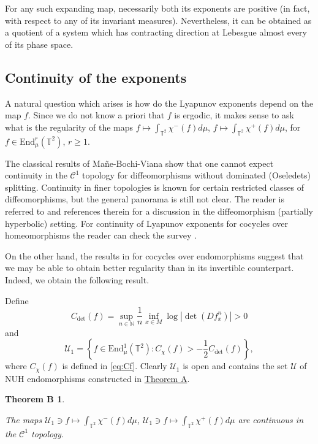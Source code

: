 \documentclass[11pt,letterpaper,reqno]{article}
\newtheorem*{theoremB}{Theorem B}
\newcommand{\Tor}{\mathbb{T}^2}
\newcommand{\TT}{\mathbb{T}^2}
\begin{document}
For any such expanding map, necessarily both its exponents are positive (in fact, with respect to any of its invariant measures). Nevertheless, it can be obtained as a quotient of a system which has contracting direction at Lebesgue almost every of its phase space. 



\subsection{Continuity of the exponents}

A natural question which arises is how do the Lyapunov exponents depend on the map $f$. Since we do not know a priori that $f$ is ergodic, it makes sense to ask what is the regularity of the maps $f\mapsto\int_{\Tor}\chi^-(f)d\mu$, $f\mapsto\int_{\Tor}\chi^+(f)d\mu$, for $f\in \mathrm{End}^r_{\mu}(\TT)$, $r\geq 1$.

The classical results of Ma\~ ne-Bochi-Viana show that one cannot expect continuity in the $\mathcal C^1$ topology for diffeomorphisms without dominated (Oseledets) splitting. Continuity in finer topologies is known for certain restricted classes of diffeomorphisms, but the general panorama is still not clear. The reader is referred to \cite{Liang2018} and references therein for a discussion in the diffeomorphism (partially hyperbolic) setting. For continuity of Lyapunov exponents for cocycles over homeomorphisms the reader can check the survey \cite{VIANA2018}.

On the other hand, the results in \cite{expcontendoVianaYang} for cocycles over endomorphisms suggest that we may be able to obtain better regularity than in its invertible counterpart. Indeed, we obtain the following result.

Define
\[
C_{\det}(f)=\sup_{n\in\mathbb N}\frac 1n\inf_{x\in M}\log|\det(Df_x^n)|>0
\]
and
\begin{equation}\label{eq:U1}
\mathcal U_1=\left\{ f\in \mathrm{End}^1_{\mu}(\TT): C_{\chi}(f)>-\frac 12C_{\det}(f)\right\},
\end{equation}
where $C_{\chi}(f)$ is defined in \eqref{eq:Cf}. Clearly $\mathcal U_1$ is open and contains the set $\mathcal U$ of NUH endomorphisms constructed in \hyperlink{theoremA}{Theorem A}. 


\begin{theoremB}\hypertarget{theoremB}{}
The maps $\mathcal U_1\ni f\mapsto\int_{\Tor}\chi^-(f)d\mu$, $\mathcal U_1\ni f\mapsto\int_{\Tor}\chi^+(f)d\mu$ are continuous in the $\mathcal C^1$ topology.
 \end{theoremB}
 
\end{document}
